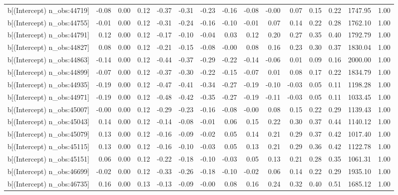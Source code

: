 \begin{table}[ht]
\begin{tabular}{rrrrrrrrrrrrrrr}
  b[(Intercept) n\_obs:44719] & -0.08 & 0.00 & 0.12 & -0.37 & -0.31 & -0.23 & -0.16 & -0.08 & -0.00 & 0.07 & 0.15 & 0.22 & 1747.95 & 1.00 \\ 
  b[(Intercept) n\_obs:44755] & -0.01 & 0.00 & 0.12 & -0.31 & -0.24 & -0.16 & -0.10 & -0.01 & 0.07 & 0.14 & 0.22 & 0.28 & 1762.10 & 1.00 \\ 
  b[(Intercept) n\_obs:44791] & 0.12 & 0.00 & 0.12 & -0.17 & -0.10 & -0.04 & 0.03 & 0.12 & 0.20 & 0.27 & 0.35 & 0.40 & 1792.79 & 1.00 \\ 
  b[(Intercept) n\_obs:44827] & 0.08 & 0.00 & 0.12 & -0.21 & -0.15 & -0.08 & -0.00 & 0.08 & 0.16 & 0.23 & 0.30 & 0.37 & 1830.04 & 1.00 \\ 
  b[(Intercept) n\_obs:44863] & -0.14 & 0.00 & 0.12 & -0.44 & -0.37 & -0.29 & -0.22 & -0.14 & -0.06 & 0.01 & 0.09 & 0.16 & 2000.00 & 1.00 \\ 
  b[(Intercept) n\_obs:44899] & -0.07 & 0.00 & 0.12 & -0.37 & -0.30 & -0.22 & -0.15 & -0.07 & 0.01 & 0.08 & 0.17 & 0.22 & 1834.79 & 1.00 \\ 
  b[(Intercept) n\_obs:44935] & -0.19 & 0.00 & 0.12 & -0.47 & -0.41 & -0.34 & -0.27 & -0.19 & -0.10 & -0.03 & 0.05 & 0.11 & 1198.28 & 1.00 \\ 
  b[(Intercept) n\_obs:44971] & -0.19 & 0.00 & 0.12 & -0.48 & -0.42 & -0.35 & -0.27 & -0.19 & -0.11 & -0.03 & 0.05 & 0.11 & 1033.45 & 1.00 \\ 
  b[(Intercept) n\_obs:45007] & -0.00 & 0.00 & 0.12 & -0.29 & -0.23 & -0.16 & -0.08 & -0.00 & 0.08 & 0.15 & 0.22 & 0.29 & 1139.43 & 1.00 \\ 
  b[(Intercept) n\_obs:45043] & 0.14 & 0.00 & 0.12 & -0.14 & -0.08 & -0.01 & 0.06 & 0.15 & 0.22 & 0.30 & 0.37 & 0.44 & 1140.12 & 1.00 \\ 
  b[(Intercept) n\_obs:45079] & 0.13 & 0.00 & 0.12 & -0.16 & -0.09 & -0.02 & 0.05 & 0.14 & 0.21 & 0.29 & 0.37 & 0.42 & 1017.40 & 1.00 \\ 
  b[(Intercept) n\_obs:45115] & 0.13 & 0.00 & 0.12 & -0.16 & -0.10 & -0.03 & 0.05 & 0.13 & 0.21 & 0.29 & 0.36 & 0.42 & 1122.78 & 1.00 \\ 
  b[(Intercept) n\_obs:45151] & 0.06 & 0.00 & 0.12 & -0.22 & -0.18 & -0.10 & -0.03 & 0.05 & 0.13 & 0.21 & 0.28 & 0.35 & 1061.31 & 1.00 \\ 
  b[(Intercept) n\_obs:46699] & -0.02 & 0.00 & 0.12 & -0.33 & -0.26 & -0.18 & -0.10 & -0.02 & 0.06 & 0.14 & 0.22 & 0.29 & 1935.10 & 1.00 \\ 
  b[(Intercept) n\_obs:46735] & 0.16 & 0.00 & 0.13 & -0.13 & -0.09 & -0.00 & 0.08 & 0.16 & 0.24 & 0.32 & 0.40 & 0.51 & 1685.12 & 1.00 \\ 

\end{tabular}
\end{table}

